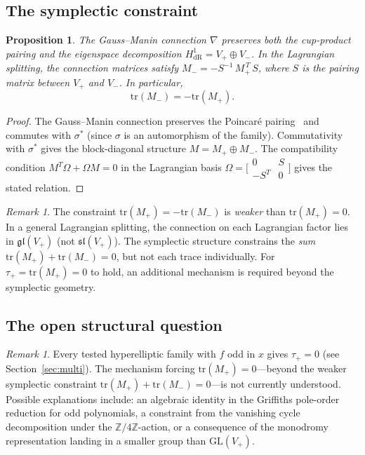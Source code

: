 \documentclass[11pt]{article}
\theoremstyle{plain}
\newtheorem{proposition}[theorem]{Proposition}
\theoremstyle{definition}
\theoremstyle{remark}
\newtheorem{remark}[theorem]{Remark}
\newcommand{\Z}{\mathbb{Z}}
\newcommand{\GL}{\mathrm{GL}}
\newcommand{\tr}{\mathrm{tr}}
\newcommand{\HdR}{H^1_{\mathrm{dR}}}
\begin{document}
\subsection{The symplectic constraint}

\begin{proposition}\label{prop:symplectic}
The Gauss--Manin connection $\nabla$ preserves both the cup-product
pairing and the eigenspace decomposition $\HdR = V_+ \oplus V_-$.
In the Lagrangian splitting, the connection matrices satisfy
$M_- = -S^{-1}\, M_+^{\,T}\, S$, where $S$ is the pairing matrix
between $V_+$ and $V_-$.  In particular,
\[
  \tr(M_-) = -\tr(M_+).
\]
\end{proposition}

\begin{proof}
The Gauss--Manin connection preserves the Poincar\'e
pairing~\cite{Griffiths1969, Deligne1971} and commutes with $\sigma^*$
(since $\sigma$ is an automorphism of the family).  Commutativity with
$\sigma^*$ gives the block-diagonal structure $M = M_+ \oplus M_-$.
The compatibility condition $M^T\Omega + \Omega M = 0$ in the
Lagrangian basis $\Omega = \bigl[\begin{smallmatrix} 0 & S \\ -S^T &
0 \end{smallmatrix}\bigr]$ gives the stated relation.
\end{proof}

\begin{remark}\label{rem:not-forced}
The constraint $\tr(M_+) = -\tr(M_-)$ is \emph{weaker} than
$\tr(M_+) = 0$.  In a general Lagrangian splitting, the connection
on each Lagrangian factor lies in $\mathfrak{gl}(V_+)$ (not
$\mathfrak{sl}(V_+)$).  The symplectic structure constrains the
\emph{sum} $\tr(M_+) + \tr(M_-) = 0$, but not each trace
individually.  For $\tau_+ = \tr(M_+) = 0$ to hold, an additional
mechanism is required beyond the symplectic geometry.
\end{remark}

\subsection{The open structural question}

\begin{remark}\label{rem:open}
Every tested hyperelliptic family with $f$ odd in $x$ gives
$\tau_+ = 0$ (see Section~\ref{sec:multi}).  The mechanism forcing
$\tr(M_+) = 0$---beyond the weaker symplectic constraint
$\tr(M_+) + \tr(M_-) = 0$---is not currently understood.  Possible
explanations include: an algebraic identity in the Griffiths
pole-order reduction for odd polynomials, a constraint from
the vanishing cycle decomposition under the $\Z/4\Z$-action,
or a consequence of the monodromy representation landing in
a smaller group than $\GL(V_+)$.
\end{remark}
\end{document}
